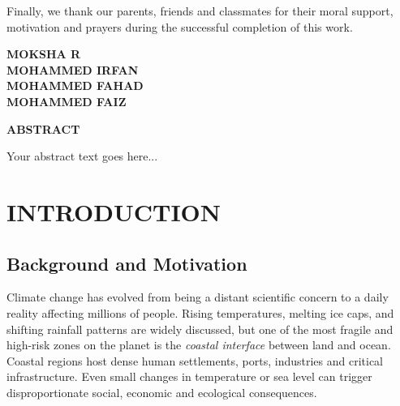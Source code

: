 \documentclass[12pt, a4paper]{article}
\begin{document}
Finally, we thank our parents, friends and classmates for their moral support,
motivation and prayers during the successful completion of this work.

\vspace{1.5cm}
\begin{flushright}
\textbf{MOKSHA R}\\
\textbf{MOHAMMED IRFAN}\\
\textbf{MOHAMMED FAHAD}\\
\textbf{MOHAMMED FAIZ}
\end{flushright}

\newpage
\setcounter{page}{1}
\begin{center}
  {\Large \textbf{ABSTRACT}}
\end{center}
\vspace{0.8cm}

Your abstract text goes here...

\newpage
\tableofcontents

\newpage
\listoffigures

\newpage
\listoftables

\newpage
\section{\textbf{INTRODUCTION}}

\subsection{\textbf{Background and Motivation}}

Climate change has evolved from being a distant scientific concern to a
daily reality affecting millions of people. Rising temperatures, melting
ice caps, and shifting rainfall patterns are widely discussed, but one of
the most fragile and high-risk zones on the planet is the \textit{coastal
interface} between land and ocean. Coastal regions host dense human
settlements, ports, industries and critical infrastructure. Even small
changes in temperature or sea level can trigger disproportionate social,
economic and ecological consequences.
\end{document}

